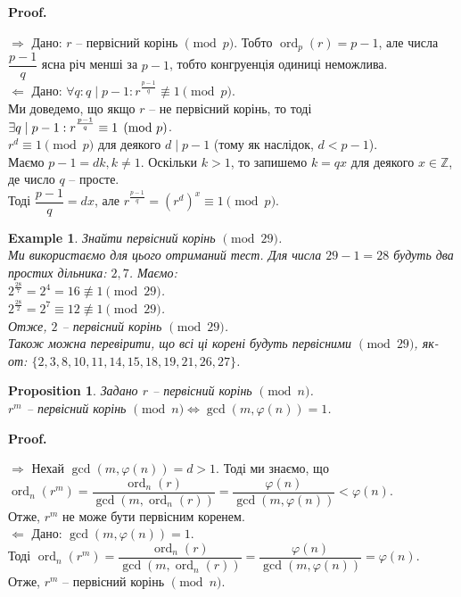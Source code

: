 \documentclass[a4paper, 10pt]{article}
\makeatletter
\theoremstyle{theoremdd}
\theoremstyle{theoremdd}
\theoremstyle{theoremdd}
\theoremstyle{theoremdd}
\newtheorem{example}[theorem]{Example}
\theoremstyle{theoremdd}
\newtheorem{proposition}[theorem]{Proposition}
\theoremstyle{theoremdd}
\theoremstyle{theoremdd}
\theoremstyle{theoremdd}
\def\rightproof{$\boxed{\Rightarrow}$ }
\def\leftproof{$\boxed{\Leftarrow}$ }
\renewenvironment{proof}[1][Proof.\\]{\par
\pushQED{\hfill \qed}%
\normalfont \topsep6\p@\@plus6\p@\relax
\trivlist
\item\relax
{\bfseries
#1\@addpunct{.}}\hspace\labelsep\ignorespaces
}{%
\popQED\endtrivlist\@endpefalse
}
\DeclareMathOperator{\ord}{ord}
\makeatother
\begin{document}
\begin{proof}
\rightproof Дано: $r$ -- первісний корінь $\!\! \pmod p$. Тобто $\ord_p (r) = p-1$, але числа $\dfrac{p-1}{q}$ ясна річ менші за $p-1$, тобто конгруенція одиниці неможлива.
\bigskip \\
\leftproof Дано: $\forall q: q \mid p-1: r^{\frac{p-1}{q}} \not\equiv 1 \pmod p$.\\
Ми доведемо, що якщо $r$ -- не первісний корінь, то тоді $\exists q \mid p-1:\\ r^{\frac{p-1}{q}} \equiv 1 \pmod p$.\\
$r^d \equiv 1 \pmod p$ для деякого $d \mid p-1$ (тому як наслідок, $d < p-1$).\\
Маємо $p-1 = dk, k \neq 1$. Оскільки $k>1$, то запишемо $k = qx$ для деякого $x \in \mathbb{Z}$, де число $q$ -- просте.\\
Тоді $\dfrac{p-1}{q} = dx$, але $r^{\frac{p-1}{q}} = (r^d)^x \equiv 1 \pmod p$.
\end{proof}

\begin{example}
Знайти первісний корінь $\!\! \pmod {29}$.\\
Ми використаємо для цього отриманий тест. Для числа $29-1=28$ будуть два простих дільника: $2,7$. Маємо:\\
$2^{\frac{28}{7}} = 2^4 = 16 \not\equiv 1 \pmod {29}$.\\
$2^{\frac{28}{2}} = 2^7 \equiv 12 \not\equiv 1 \pmod {29}$.\\
Отже, $2$ -- первісний корінь $\pmod {29}$.\\
Також можна перевірити, що всі ці корені будуть первісними $\pmod {29}$, як-от: $\{2,3,8,10,11,14,15,18,19,21,26,27\}$.
\end{example}

\begin{proposition}
Задано $r$ -- первісний корінь $\!\! \pmod n$.\\
$r^m$ -- первісний корінь $\!\! \pmod n \iff \gcd(m,\varphi(n)) = 1$.
\end{proposition}

\begin{proof}
\rightproof Нехай $\gcd(m,\varphi(n)) = d > 1$. Тоді ми знаємо, що\\
$\ord_n (r^m) = \dfrac{\ord_n (r)}{\gcd(m,\ord_n (r))} = \dfrac{\varphi(n)}{\gcd(m,\varphi(n))} < \varphi(n)$.\\
Отже, $r^m$ не може бути первісним коренем.
\bigskip \\
\leftproof Дано: $\gcd(m,\varphi(n)) = 1$.\\
Тоді $\ord_{n} (r^m) = \dfrac{\ord_n (r)}{\gcd(m,\ord_n (r))} = \dfrac{\varphi(n)}{\gcd(m,\varphi(n))} = \varphi(n)$.\\
Отже, $r^m$ -- первісний корінь $\!\! \pmod n$.
\end{proof}
\end{document}
